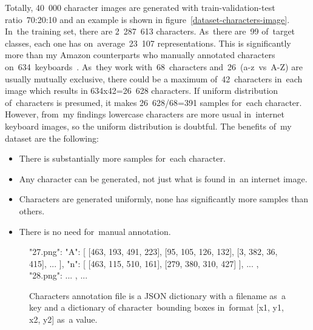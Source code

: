 Totally, 40~000 character images are generated with train-validation-test ratio~70:20:10 and an example is shown in figure~\ref{dataset-characters-image}. In~the training set, there are 2~287~613 characters. As~there are~99 of~target classes, each one has on~average~23~107 representations. This is significantly more than my Amazon counterparts who manually annotated characters on~634~keyboards~\cite{amazon-paper}. As~they work with~68~characters and~26~(a-z~vs~A-Z) are usually mutually exclusive, there could be a maximum of~42~characters in~each image which results in 634x42=26~628 characters. If uniform distribution of~characters is presumed, it makes 26~628/68=391 samples for~each character. However, from~my findings lowercase characters are more usual in~internet keyboard images, so the uniform distribution is doubtful. The benefits of~my dataset are the following:

\begin{itemize}[topsep=0pt,itemsep=-1.5pt,partopsep=6pt]
    \item There is substantially more samples for~each character.
    \item Any character can be generated, not just what is found in~an internet image.
    \item Characters are generated uniformly, none has significantly more samples than others.
    \item There is no need for~manual annotation.
\end{itemize}

\vspace{-6pt}
\begin{figure}[!hbt]
    \centering
    \begin{boxedverbatim}
"27.png": {
    "A": [
        [463, 193, 491, 223],
        [95, 105, 126, 132],
        [3, 382, 36, 415],
        ...
    ],
    "n": [
        [463, 115, 510, 161],
        [279, 380, 310, 427]
    ],
    ...
},
"28.png": {
    ...
},
...
\end{boxedverbatim}
    \vspace{-6pt}
    \caption{Characters annotation file is a JSON dictionary with a filename as~a key and a dictionary of character~bounding boxes in~format [x1, y1, x2, y2] as~a value.}
    \label{characters-annotation-json}
\end{figure}

